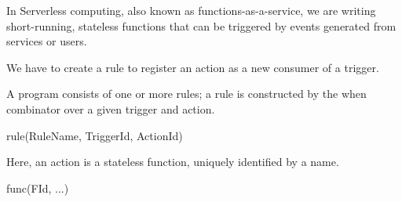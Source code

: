 \documentclass[../extensions.tex]{subfiles}
\begin{document}
In Serverless computing, also known as functions-as-a-service, we are writing short-running, stateless functions that can be triggered by events generated from services or users.

We have to create a rule to register an action as a new consumer of a trigger.

A program consists of one or more rules; a rule is constructed by the when combinator over a given trigger and action.

rule(RuleName, TriggerId, ActionId)

Here, an action is a stateless function, uniquely identified by a name.

func(FId, ...)
\end{document}
